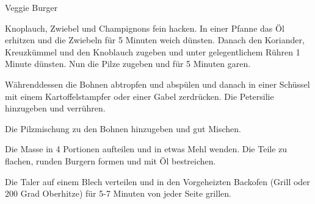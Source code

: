 \begin{recipe}[]{ Veggie Burger }{ }{  }



\step
Knoplauch, Zwiebel und Champignons fein hacken. In einer Pfanne das Öl erhitzen und die Zwiebeln für 5 Minuten weich dünsten. Danach den Koriander, Kreuzkümmel und den Knoblauch zugeben und unter gelegentlichem Rühren 1 Minute dünsten. Nun die Pilze zugeben und für 5 Minuten garen.

\step
Währenddessen die Bohnen abtropfen und abspülen und danach in einer Schüssel mit einem Kartoffelstampfer oder einer Gabel zerdrücken. Die Petersilie hinzugeben und verrühren.


\step
Die Pilzmischung zu den Bohnen hinzugeben und gut Mischen. 

\step 
Die Masse in 4 Portionen aufteilen und in etwas Mehl wenden. Die Teile zu flachen, runden Burgern formen und mit Öl bestreichen.

\step 
Die Taler auf einem Blech verteilen und in den Vorgeheizten Backofen (Grill oder 200 Grad Oberhitze) für 5-7 Minuten von jeder Seite grillen.



\end{recipe}
